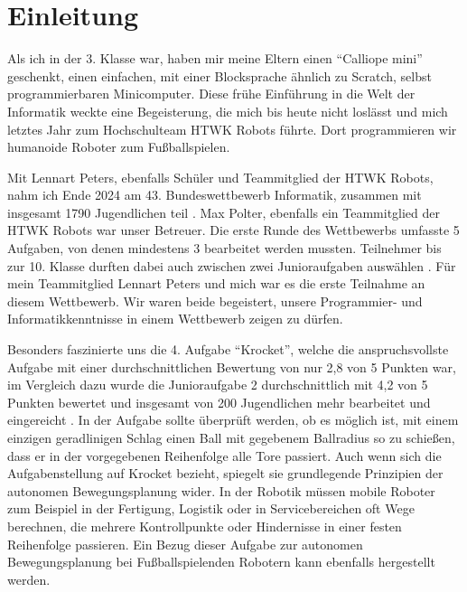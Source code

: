 \section{Einleitung}

Als ich in der 3. Klasse war, haben mir meine Eltern einen \enquote{Calliope mini} geschenkt, einen einfachen, mit einer Blocksprache ähnlich zu Scratch, selbst programmierbaren Minicomputer. Diese frühe Einführung in die Welt der Informatik weckte eine Begeisterung, die mich bis heute nicht loslässt und mich letztes Jahr zum Hochschulteam HTWK Robots führte. Dort programmieren wir humanoide Roboter zum Fußballspielen.

Mit Lennart Peters, ebenfalls Schüler und Teammitglied der HTWK Robots, nahm ich Ende 2024 am 43. Bundeswettbewerb Informatik, zusammen mit insgesamt 1790 Jugendlichen teil \cite{teilnehmerzahl}. Max Polter, ebenfalls ein Teammitglied der HTWK Robots war unser Betreuer. Die erste Runde des Wettbewerbs umfasste 5 Aufgaben, von denen mindestens 3 bearbeitet werden mussten. Teilnehmer bis zur 10. Klasse durften dabei auch zwischen zwei Junioraufgaben auswählen \cite{aufgaben}. Für mein Teammitglied Lennart Peters und mich war es die erste Teilnahme an diesem Wettbewerb. Wir waren beide begeistert, unsere Programmier- und Informatikkenntnisse in einem Wettbewerb zeigen zu dürfen.

Besonders faszinierte uns die 4. Aufgabe \enquote{Krocket}, welche die anspruchsvollste Aufgabe mit einer durchschnittlichen Bewertung von nur 2,8 von 5 Punkten war, im Vergleich dazu wurde die Junioraufgabe 2 durchschnittlich mit 4,2 von 5 Punkten bewertet und insgesamt von 200 Jugendlichen mehr bearbeitet und eingereicht \cite{anschreiben}. In der Aufgabe sollte überprüft werden, ob es möglich ist, mit einem einzigen geradlinigen Schlag einen Ball mit gegebenem Ballradius so zu schießen, dass er in der vorgegebenen Reihenfolge alle Tore passiert. Auch wenn sich die Aufgabenstellung auf Krocket bezieht, spiegelt sie grundlegende Prinzipien der autonomen Bewegungsplanung wider. In der Robotik müssen mobile Roboter zum Beispiel in der Fertigung, Logistik oder in Servicebereichen oft Wege berechnen, die mehrere Kontrollpunkte oder Hindernisse in einer festen Reihenfolge passieren. Ein Bezug dieser Aufgabe zur autonomen Bewegungsplanung bei Fußballspielenden Robotern kann ebenfalls hergestellt werden.


